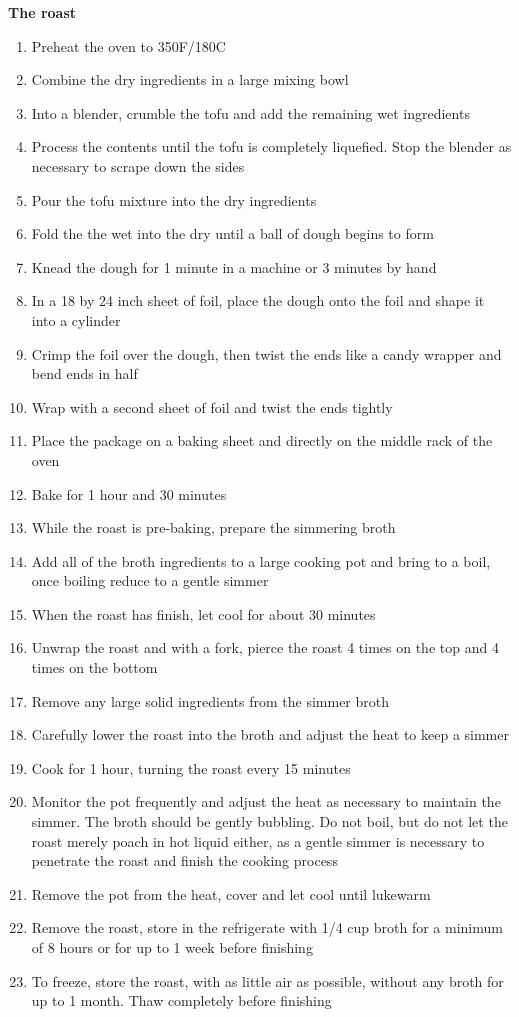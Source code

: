 \begin{footnotesize}

\noindent
\textbf{The roast}
\begin{enumerate}
    \item Preheat the oven to 350\degree F/180\degree C
    \item Combine the dry ingredients in a large mixing bowl
    \item Into a blender, crumble the tofu and add the remaining wet ingredients
    \item Process the contents until the tofu is completely liquefied. Stop the blender as necessary to scrape down the sides
    \item Pour the tofu mixture into the dry ingredients
    \item Fold the the wet into the dry until a ball of dough begins to form
    \item Knead the dough for 1 minute in a machine or 3 minutes by hand
    \item In a 18 by 24 inch sheet of foil, place the dough onto the foil and shape it into a cylinder
    \item Crimp the foil over the dough, then twist the ends like a candy wrapper and bend ends in half
    \item Wrap with a second sheet of foil and twist the ends tightly
    \item Place the package on a baking sheet and directly on the middle rack of the oven
    \item Bake for 1 hour and 30 minutes
    \item While the roast is pre-baking, prepare the simmering broth
    \item Add all of the broth ingredients to a large cooking pot and bring to a boil, once boiling reduce to a gentle simmer
    \item When the roast has finish, let cool for about 30 minutes
    \item Unwrap the roast and with a fork, pierce the roast 4 times on the top and 4 times on the bottom
    \item Remove any large solid ingredients from the simmer broth
    \item Carefully lower the roast into the broth and adjust the heat to keep a simmer
    \item Cook for 1 hour, turning the roast every 15 minutes
    \item Monitor the pot frequently and adjust the heat as necessary to maintain the simmer. The broth should be gently bubbling. Do not boil, but do not let the roast merely poach in hot liquid either, as a gentle simmer is necessary to penetrate the roast and finish the cooking process
    \item Remove the pot from the heat, cover and let cool until lukewarm
    \item Remove the roast, store in the refrigerate with 1/4 cup broth for a minimum of 8 hours or for up to 1 week before finishing
    \item To freeze, store the roast, with as little air as possible, without any broth for up to 1 month. Thaw completely before finishing
\end{enumerate}


\end{footnotesize}
